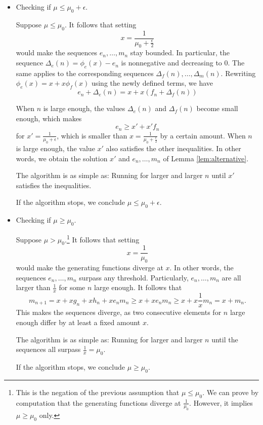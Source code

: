 \documentclass[a4paper,12pt]{article}
\begin{document}
\begin{itemize}
    \item Checking if $\mu\le \mu_0+\epsilon$.

    Suppose $\mu\le \mu_0$. It follows that setting
    \[
        x=\frac{1}{\mu_0+\frac{\epsilon}{2}}
    \]
    would make the sequences $e_n,\dots,m_n$ stay bounded. In particular, the sequence $\Delta_e(n) = \phi_e(x) - e_n$ is nonnegative and decreasing to $0$. The same applies to the corresponding sequences $\Delta_f(n),\dots,\Delta_m(n)$. 
    Rewriting $\phi_e(x) = x + x\phi_f(x)$ using the newly defined terms, we have
    \[
        e_n + \Delta_e(n) = x + x(f_n + \Delta_f(n))
    \]
    
    When $n$ is large enough, the values $\Delta_e(n)$ and $\Delta_f(n)$ become small enough, which makes
    \[
        e_n \ge x' + x'f_n
    \]
    for $x'=\frac{1}{\mu_0+\epsilon}$, which is smaller than $x=\frac{1}{\mu_0+\frac{\epsilon}{2}}$ by a certain amount.
    When $n$ is large enough, the value $x'$ also satisfies the other inequalities. In other words, we obtain the solution $x'$ and $e_n,\dots,m_n$ of Lemma \ref{lem:alternative}.
    
    The algorithm is as simple as: Running for larger and larger $n$ until $x'$ satisfies the inequalities.
    
    If the algorithm stops, we conclude $\mu\le \mu_0+\epsilon$.
    
    \item Checking if $\mu\ge \mu_0$.

    Suppose $\mu>\mu_0$.\footnote{This is the negation of the previous assumption that $\mu\le\mu_0$. We can prove by computation that the generating functions diverge at $\frac{1}{\mu_0}$. However, it implies $\mu\ge \mu_0$ only.} It follows that setting
    \[
        x=\frac{1}{\mu_0}
    \]
    would make the generating functions diverge at $x$. In other words, the sequences $e_n,\dots,m_n$ surpass any threshold.  Particularly, $e_n,\dots,m_n$ are all larger than $\frac{1}{x}$ for some $n$ large enough. It follows that
    \[
      m_{n+1} = x + x g_n + x h_n + x e_n m_n \ge x + xe_nm_n\ge x + x\frac{1}{x}m_n = x + m_n.
    \]
    This makes the sequences diverge, as two consecutive elements for $n$ large enough differ by at least a fixed amount $x$.

    The algorithm is as simple as: Running for larger and larger $n$ until the sequences all surpass $\frac{1}{x}=\mu_0$.
    
    If the algorithm stops, we conclude $\mu\ge \mu_0$.
\end{itemize}
\end{document}
